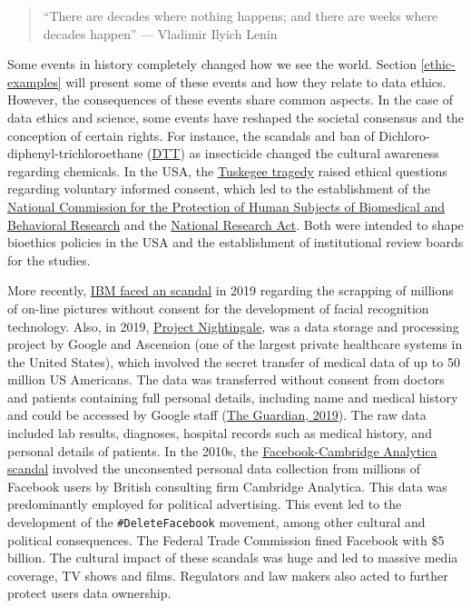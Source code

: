 \documentclass[
]{book}
\begin{document}
\begin{quote}
``There are decades where nothing happens; and there are weeks where decades happen'' --- Vladimir Ilyich Lenin \citep{friedman2014there}
\end{quote}

Some events in history completely changed how we see the world. Section \ref{ethic-examples} will present some of these events and how they relate to data ethics. However, the consequences of these events share common aspects. In the case of data ethics and science, some events have reshaped the societal consensus and the conception of certain rights. For instance, the scandals and ban of Dichloro-diphenyl-trichloroethane (\href{https://www.nytimes.com/2004/04/11/magazine/what-the-world-needs-now-is-ddt.html}{DTT}) as insecticide changed the cultural awareness regarding chemicals. In the USA, the \href{https://en.wikipedia.org/wiki/Tuskegee_Syphilis_Study}{Tuskegee tragedy} raised ethical questions regarding voluntary informed consent, which led to the establishment of the \href{https://en.wikipedia.org/wiki/National_Commission_for_the_Protection_of_Human_Subjects_of_Biomedical_and_Behavioral_Research}{National Commission for the Protection of Human Subjects of Biomedical and Behavioral Research} and the \href{https://en.wikipedia.org/wiki/National_Research_Act}{National Research Act}. Both were intended to shape bioethics policies in the USA and the establishment of institutional review boards for the studies.

More recently, \href{https://www.nbcnews.com/tech/internet/facial-recognition-s-dirty-little-secret-millions-online-photos-scraped-n981921}{IBM faced an scandal} in 2019 regarding the scrapping of millions of on-line pictures without consent for the development of facial recognition technology. Also, in 2019, \href{https://en.wikipedia.org/wiki/Project_Nightingale}{Project Nightingale}, was a data storage and processing project by Google and Ascension (one of the largest private healthcare systems in the United States), which involved the secret transfer of medical data of up to 50 million US Americans. The data was transferred without consent from doctors and patients containing full personal details, including name and medical history and could be accessed by Google staff (\href{https://www.theguardian.com/technology/2019/nov/12/google-medical-data-project-nightingale-secret-transfer-us-health-information}{The Guardian, 2019}). The raw data included lab results, diagnoses, hospital records such as medical history, and personal details of patients. In the 2010s, the \href{https://en.wikipedia.org/wiki/Facebook\%E2\%80\%93Cambridge_Analytica_data_scandal}{Facebook-Cambridge Analytica scandal} involved the unconsented personal data collection from millions of Facebook users by British consulting firm Cambridge Analytica. This data was predominantly employed for political advertising. This event led to the development of the \texttt{\#DeleteFacebook} movement, among other cultural and political consequences. The Federal Trade Commission fined Facebook with \$5 billion. The cultural impact of these scandals was huge and led to massive media coverage, TV shows and films. Regulators and law makers also acted to further protect users data ownership.
\end{document}
